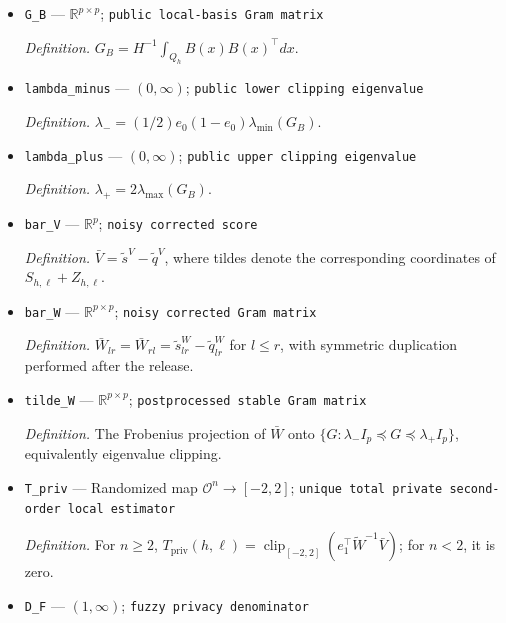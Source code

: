 \documentclass{article}
\begin{document}
\begin{itemize}
  \par\smallskip\noindent\emph{Definition.} A vector of mutually independent \(\operatorname{Laplace}(\Delta_1(S_{h,\ell})/\epsilon_n)\) coordinates.
  \item \texttt{G\_\allowbreak{}B} --- \(\mathbb R^{p\times p}\); \texttt{public local-\allowbreak{}basis Gram matrix}
  \par\smallskip\noindent\emph{Definition.} \(G_B=H^{-1}\int_{Q_h}B(x)B(x)^\top dx\).
  \item \texttt{lambda\_\allowbreak{}minus} --- \((0,\infty)\); \texttt{public lower clipping eigenvalue}
  \par\smallskip\noindent\emph{Definition.} \(\lambda_-=(1/2)e_0(1-e_0)\lambda_{\min}(G_B)\).
  \item \texttt{lambda\_\allowbreak{}plus} --- \((0,\infty)\); \texttt{public upper clipping eigenvalue}
  \par\smallskip\noindent\emph{Definition.} \(\lambda_+=2\lambda_{\max}(G_B)\).
  \item \texttt{bar\_\allowbreak{}V} --- \(\mathbb R^p\); \texttt{noisy corrected score}
  \par\smallskip\noindent\emph{Definition.} \(\bar V=\widetilde s^V-\widetilde q^V\), where tildes denote the corresponding coordinates of \(S_{h,\ell}+Z_{h,\ell}\).
  \item \texttt{bar\_\allowbreak{}W} --- \(\mathbb R^{p\times p}\); \texttt{noisy corrected Gram matrix}
  \par\smallskip\noindent\emph{Definition.} \(\bar W_{lr}=\bar W_{rl}=\widetilde s_{lr}^W-\widetilde q_{lr}^W\) for \(l\le r\), with symmetric duplication performed after the release.
  \item \texttt{tilde\_\allowbreak{}W} --- \(\mathbb R^{p\times p}\); \texttt{postprocessed stable Gram matrix}
  \par\smallskip\noindent\emph{Definition.} The Frobenius projection of \(\bar W\) onto \(\{G:\lambda_-I_p\preceq G\preceq\lambda_+I_p\}\), equivalently eigenvalue clipping.
  \item \texttt{T\_\allowbreak{}priv} --- Randomized map \(\mathcal O^n\to[-2,2]\); \texttt{unique total private second-\allowbreak{}order local estimator}
  \par\smallskip\noindent\emph{Definition.} For \(n\ge2\), \(T_{\mathrm{priv}}(h,\ell)=\operatorname{clip}_{[-2,2]}(e_1^\top\widetilde W^{-1}\bar V)\); for \(n<2\), it is zero.
  \item \texttt{D\_\allowbreak{}F} --- \((1,\infty)\); \texttt{fuzzy privacy denominator}

\end{itemize}
\end{document}
